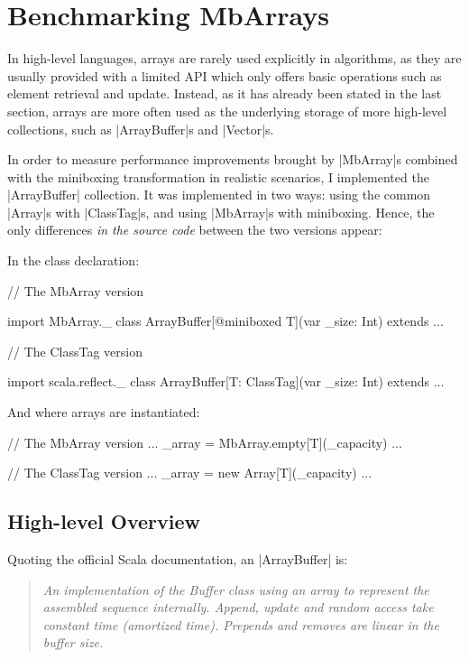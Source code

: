 \section{Benchmarking MbArrays}
\label{sec:bench}

In high-level languages, arrays are rarely used explicitly in algorithms, as they are usually provided with a limited API which only offers basic operations such as element retrieval and update. Instead, as it has already been stated in the last section, arrays are more often used as the underlying storage of more high-level collections, such as |ArrayBuffer|s and |Vector|s.

In order to measure performance improvements brought by |MbArray|s combined with the miniboxing transformation in realistic scenarios, I implemented the |ArrayBuffer| collection. It was implemented in two ways: using the common |Array|s with |ClassTag|s, and using |MbArray|s with miniboxing.
Hence, the only differences \emph{in the source code} between the two versions appear:

In the class declaration: %
  
\begin{lstlisting-nobreak}
// The MbArray version

import MbArray._
class ArrayBuffer[@miniboxed T](var _size: Int) 
	extends ...

// The ClassTag version

import scala.reflect._
class ArrayBuffer[T: ClassTag](var _size: Int)   
	extends ...
\end{lstlisting-nobreak}

And where arrays are instantiated:

\begin{lstlisting-nobreak}
// The MbArray version
	...
	_array = MbArray.empty[T](_capacity)
	...

// The ClassTag version
	...
	_array = new Array[T](_capacity)
	...
\end{lstlisting-nobreak}

\subsection{High-level Overview}

Quoting the official Scala documentation, an |ArrayBuffer| is: 
\begin{quote}
\textit{An implementation of the Buffer class using an array to represent the assembled sequence internally. Append, update and random access take constant time (amortized time). Prepends and removes are linear in the buffer size.} 
\end{quote}

